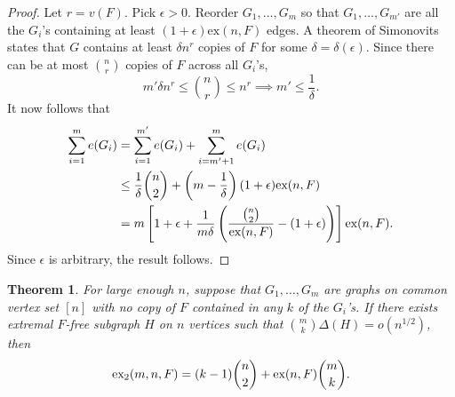 \documentclass[10pt, reqno]{report}
\newtheorem{theorem}{Theorem}[chapter]
\newcommand*{\ex}{\textnormal{ex}}
\newcommand*{\dex}{\textnormal{ex}_2}
\begin{document}
\begin{proof}
  Let $r = v(F)$. Pick $\epsilon > 0$. Reorder $G_1, \ldots, G_m$ so that $G_1, \ldots, G_{m'}$ are all the $G_i$'s containing at least $(1 + \epsilon)\text{ex}(n, F)$ edges. A theorem of Simonovits states that $G$ contains at least $\delta n^r$ copies of $F$ for some $\delta = \delta(\epsilon)$. Since there can be at most $\binom{n}{r}$ copies of $F$ across all $G_i$'s, 
  \[
    m'\delta n^{r} \leq \binom{n}{r} \leq n^r \implies m' \leq \frac{1}{\delta}.
  \]
  It now follows that
  \begin{align*}
    \sum_{i = 1}^m e(G_i) 
    &= \sum_{i = 1}^{m'} e(G_i) + \sum_{i = m' + 1}^m e(G_i) \\
    &\leq \frac{1}{\delta}\binom{n}{2} + \left(m - \frac{1}{\delta}\right)(1 + \epsilon)\text{ex}(n, F) \\
    &= m\left[1 + \epsilon + \frac{1}{m\delta}\left(\frac{\binom{n}{2}}{\ex(n, F)} - (1 + \epsilon)\right)\right]\ex(n, F).
  \end{align*}
  Since $\epsilon$ is arbitrary, the result follows.
\end{proof}

\begin{theorem}
  For large enough $n$, suppose that $G_1, \ldots, G_m$ are graphs on common vertex set $[n]$ with no copy of $F$ contained in any $k$ of the $G_i$'s. If there exists extremal $F$-free subgraph $H$ on $n$ vertices such that $\binom{m}{k}\Delta(H) = o(n^{1/2})$, then
  \[
    \dex(m, n ,F) = (k - 1)\binom{n}{2} + \ex(n, F)\binom{m}{k}.
  \]
\end{theorem}
\end{document}
